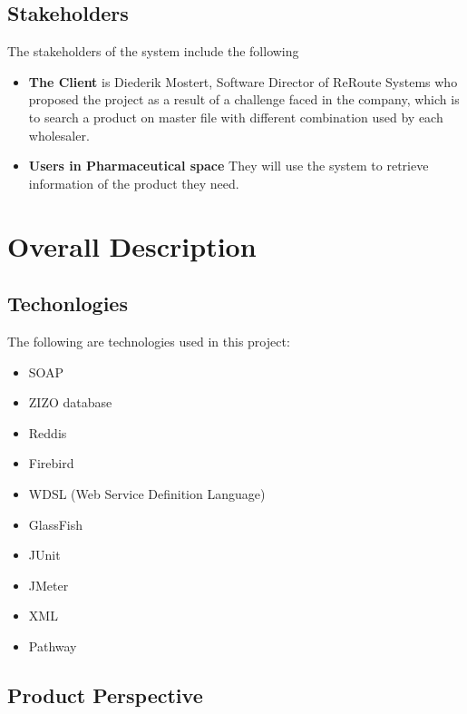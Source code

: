 \documentclass[a4paper,10pt]{article}
\begin{document}
	\subsection{Stakeholders}
	The stakeholders of the system include the following
	\begin{itemize}
	\item \textbf{The Client} is Diederik Mostert, Software Director of ReRoute Systems who proposed the project as a result of a challenge faced in the company, which is to search a product on master file with different combination used by each wholesaler.
	\item \textbf{Users in Pharmaceutical space} They will use the system to retrieve information of the product they need.
	\end{itemize}

	\newpage

\section{Overall Description}

\subsection{Techonlogies}{
	The following are technologies used in this project:\\
	\begin{itemize}
		\item SOAP
		\item ZIZO database
		\item Reddis
		\item Firebird
		\item WDSL (Web Service Definition Language)
		\item GlassFish
		\item JUnit
		\item JMeter
		\item XML
		\item Pathway
	\end{itemize}
}
	
\subsection{Product Perspective}
\end{document}
